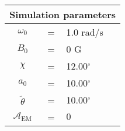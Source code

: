 \begin{tabular}{ccl}
\multicolumn{3}{c}{Simulation parameters} \\
\hline
$\omega_0$  &=& 1.0 rad/s\\
$B_0$  &=& $0$ G \\
$\chi$  &=& 12.00$^{\circ}$ \\
$a_0$ &=& 10.00$^{\circ}$ \\
$\tilde{\theta}$ &= & 10.00$^{\circ}$ \\
$\mathcal{A}_{\mathrm{EM}}$ &= & $0$
\end{tabular}
